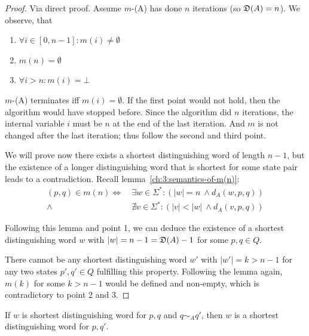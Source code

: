 \begin{proof}
	Via direct proof. Assume $m$-\CompDist(A) has done $n$ iterations (so $\mathfrak{D}(A) = n$). We observe, that
	\begin{enumerate}
		\item $\forall i \in [0,n-1]\colon m(i) \neq \emptyset$
		\item $m(n)= \emptyset$
		\item $\forall i > n\colon m(i)= \bot$
	\end{enumerate}
	$m$-\CompDist(A) terminates iff $m(i) = \emptyset$. If the first point would not hold, then the algorithm would have stopped before. Since the algorithm did $n$ iterations, the internal variable $i$ must be $n$ at the end of the last iteration. And $m$ is not changed after the last iteration; thus follow the second and third point.
    
    We will prove now there exists a shortest distinguishing word of length $n-1$, but the existence of a longer distinguishing word that is shortest for some state pair leads to a contradiction. Recall lemma~\ref{ch:3:semantics-of-m(n)}:
    \begin{align*}
    (p,q) \in m(n) \Longleftrightarrow\ &\exists w\in\Sigma^*\colon (|w| = n\ \land d_A(w, p, q))\\
    \land\ &\nexists v\in\Sigma^*\colon (|v| < |w|\ \land d_A(v, p, q))
    \end{align*}

	
	\noindent Following this lemma and point 1, we can deduce the existence of a shortest distinguishing word $w$ with $|w| = n-1 = \mathfrak{D}(A)-1$ for some $p,q \in Q$.
	
	
	There cannot be any shortest distinguishing word $w'$ with $|w'| = k > n-1$ for any two states $p',q'\in Q$ fulfilling this property. Following the lemma again, $m(k)$ for some $k > n-1$ would be defined and non-empty, which is contradictory to point 2 and 3.
\end{proof}

\begin{lemma}\label{ch:3:lem:disting-trans}
	If $w$ is shortest distinguishing word for $p,q$ and $q \sim_A q'$, then $w$ is a shortest distinguishing word for $p,q'$.
\end{lemma}

